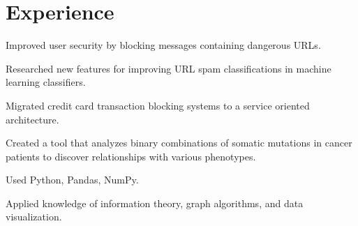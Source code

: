 \documentclass[letterpaper]{deedy-resume} %
\begin{document}
\begin{minipage}[t]{0.66\textwidth} %


\section{Experience}


\vspace{\topsep} %

\begin{tightitemize}
\item Improved user security by blocking messages containing dangerous URLs.
\item Researched new features for improving URL spam classifications in machine
  learning classifiers.
\item Migrated credit card transaction blocking systems to a service oriented
  architecture.
\end{tightitemize}

\sectionspace %




\begin{tightitemize}
\item Created a tool that analyzes binary combinations of somatic mutations in
  cancer patients to discover relationships with various phenotypes.
\item Used Python, Pandas, NumPy.
\item Applied knowledge of information theory, graph algorithms, and data
  visualization.
\end{tightitemize}

\sectionspace %




\end{minipage}
\end{document}

